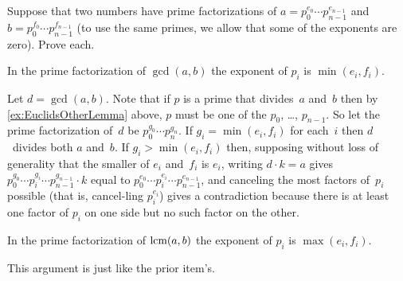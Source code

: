 \documentclass{test}  %
\begin{document}
\begin{problem}
Suppose that two numbers have prime factorizations 
of $a=p_0^{e_0}\cdots p_{n-1}^{e_{n-1}}$
and $b=p_0^{f_0}\cdots p_{n-1}^{f_{n-1}}$
(to use the same primes, we allow that some of the exponents are zero).
Prove each.
\begin{exes}
\begin{exercise}
  In the prime factorization of
  $\gcd(a,b)$ the exponent of $p_i$ is $\min(e_i,f_i)$.
\end{exercise}
\begin{answer}
  Let $d=\gcd(a,b)$.
  Note that if $p$ is a prime that divides~$a$ and~$b$ then
  by \ref{ex:EuclidsOtherLemma} above, $p$ must be one of the 
  $p_0$, \ldots, $p_{n-1}$.   
  So let the prime factorization of~$d$ be $p_0^{g_0}\cdots p_n^{g_n}$. 
  If $g_i=\min(e_i,f_i)$ for each~$i$ then $d$~divides both $a$ and~$b$.
  If $g_i>\min(e_i,f_i)$ then, supposing without loss of generality
  that the smaller of $e_i$ and~$f_i$ is $e_i$, writing
  $d\cdot k=a$ gives $p_0^{g_0}\cdots p_i^{g_i}\cdots p_{n-1}^{g_{n-1}}\cdot k$
  equal to $p_0^{e_0}\cdots p_i^{e_i}\cdots p_{n-1}^{e_{n-1}}$, and 
  canceling the most factors of~$p_i$ possible (that is, cancel-ling $p_i^{e_i}$)
  gives a contradiction because there is at least one factor
  of $p_i$ on one side but no such factor on the other.  
\end{answer}
\begin{exercise} 
  In the prime factorization of $\operatorname{lcm}(a,b)$ the exponent of 
  $p_i$ is $\max(e_i,f_i)$.
\end{exercise}
\begin{answer}
  This argument is just like the prior item's.    
\end{answer}
\end{exes}

\end{problem}
\end{document}
